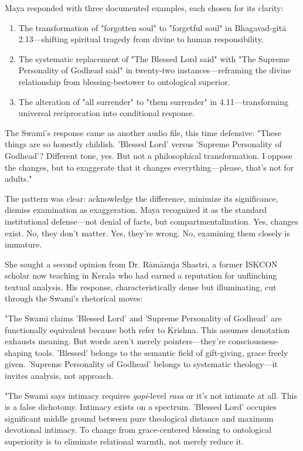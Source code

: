 \documentclass[12pt]{article}
\begin{document}
Maya responded with three documented examples, each chosen for its clarity:

\begin{enumerate}
\item The transformation of "forgotten soul" to "forgetful soul" in Bhagavad-gītā 2.13—shifting spiritual tragedy from divine to human responsibility.

\item The systematic replacement of "The Blessed Lord said" with "The Supreme Personality of Godhead said" in twenty-two instances—reframing the divine relationship from blessing-bestower to ontological superior.

\item The alteration of "all surrender" to "them surrender" in 4.11—transforming universal reciprocation into conditional response.
\end{enumerate}

The Swami's response came as another audio file, this time defensive: "These things are so honestly childish. 'Blessed Lord' versus 'Supreme Personality of Godhead'? Different tone, yes. But not a philosophical transformation. I oppose the changes, but to exaggerate that it changes everything—please, that's not for adults."

The pattern was clear: acknowledge the difference, minimize its significance, dismiss examination as exaggeration. Maya recognized it as the standard institutional defense—not denial of facts, but compartmentalization. Yes, changes exist. No, they don't matter. Yes, they're wrong. No, examining them closely is immature.

She sought a second opinion from Dr. Rāmānuja Shastri, a former ISKCON scholar now teaching in Kerala who had earned a reputation for unflinching textual analysis. His response, characteristically dense but illuminating, cut through the Swami's rhetorical moves:

"The Swami claims 'Blessed Lord' and 'Supreme Personality of Godhead' are functionally equivalent because both refer to Krishna. This assumes denotation exhausts meaning. But words aren't merely pointers—they're consciousness-shaping tools. 'Blessed' belongs to the semantic field of gift-giving, grace freely given. 'Supreme Personality of Godhead' belongs to systematic theology—it invites analysis, not approach.

"The Swami says intimacy requires \textit{gopi}-level \textit{rasa} or it's not intimate at all. This is a false dichotomy. Intimacy exists on a spectrum. 'Blessed Lord' occupies significant middle ground between pure theological distance and maximum devotional intimacy. To change from grace-centered blessing to ontological superiority is to eliminate relational warmth, not merely reduce it.
\end{document}
